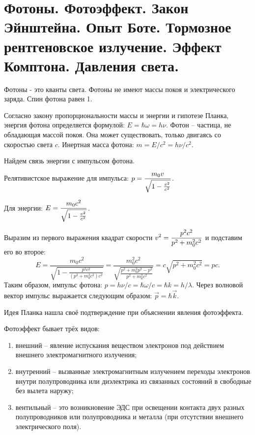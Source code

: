 \chapter{Фотоны. Фотоэффект. Закон Эйнштейна. Опыт Боте. Тормозное 
рентгеновское излучение. Эффект Комптона. Давления света.}

Фотоны - это кванты света. Фотоны не имеют массы покоя и электрического заряда.
Спин фотона равен 1.

Согласно закону пропорциональности массы и энергии и гипотезе Планка, энергия
фотона определяется формулой: \( E = \hbar\omega = h\nu \). Фотон -- частица, не
обладающая массой покоя. Она может существовать, только двигаясь со скоростью
света \( c \). Инертная масса фотона: \( m = E/c^2 = h\nu/c^2 \).

Найдем связь энергии с импульсом фотона.

Релятивистское выражение для импульса: \( \displaystyle p = \frac{m_0v}{\sqrt{1 -
\frac{v^2}{c^2}}} \).

Для энергии: \( \displaystyle E = \frac{m_0c^2}{\sqrt{1 - \frac{v^2}{c^2}}} \).

Выразим из первого выражения квадрат скорости \( \displaystyle v^2 = \frac{p^2c^2}{p^2 +
m_0^2c^2} \) и подставим его во второе:
\[
    E = \frac{m_0c^2}{\sqrt{1 - \frac{p^2c^2}{(p^2 + m_0^2c^2)c^2}}} =
    \frac{m_0^2c^2}{\sqrt{\frac{p^2 + m_0^2p^2 - p^2}{p^2 + m_0^2c^2}}} =
    c\sqrt{p^2 + m_0^2c^2} = pc.
\]
Таким образом, импульс фотона: \( p = h\nu/c = \hbar\omega/c = \hbar k =
h/\lambda \). Через волновой вектор импульс выражается следующим образом:
\( \vec{p} = \hbar\vec{k} \).

Идея Планка нашла своё подтверждение при объяснении явления фотоэффекта.

Фотоэффект бывает трёх видов:
\begin{enumerate}
    \item внешний -- явление испускания веществом электронов под действием
    внешнего электромагнитного излучения;
    \item внутренний -- вызванные электромагнитным излучением переходы
    электронов внутри полупроводника или диэлектрика из связанных состояний в
    свободные без вылета наружу;
    \item вентильный -- это возникновение ЭДС при освещении контакта двух разных
    полупроводников или полупроводника и металла (при отсутствии внешнего
    электрического поля).
\end{enumerate}

